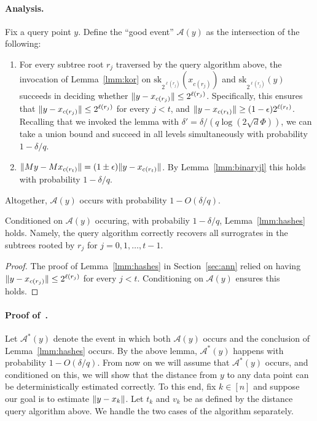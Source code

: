 \paragraph{Analysis.}
Fix a query point $y$.
Define the ``good event'' $\mathcal A(y)$ as the intersection of the following:
\begin{enumerate}
  \item For every subtree root $r_j$ traversed by the query algorithm above, the invocation of Lemma~\ref{lmm:kor} on $\mathrm{sk}_{2^{\ell(r_j)}}(x_{c(r_j)})$ and $\mathrm{sk}_{2^{\ell(r_j)}}(y)$ succeeds in deciding whether $\lVert y-x_{c(r_j)}\rVert\leq 2^{\ell(r_j)}$.
  Specifically, this ensures that $\lVert y-x_{c(r_j)}\rVert\leq 2^{\ell(r_j)}$ for every $j<t$, and $\lVert y-x_{c(r_t)}\rVert\geq (1-\epsilon)2^{\ell(r_t)}$.
  Recalling that we invoked the lemma with $\delta'=\delta/(q\log(2\sqrt{d}\Phi))$, we can take a union bound and succeed in all levels simultaneously with probability $1-\delta/q$.

  \item $\lVert My-Mx_{c(r_t)}\rVert=(1\pm\epsilon)\lVert y-x_{c(r_t)}\rVert$. By Lemma~\ref{lmm:binaryjl} this holds with probability $1-\delta/q$.
\end{enumerate}
Altogether, $\mathcal A(y)$ occurs with probability $1-O(\delta/q)$.

\begin{lemma}
Conditioned on $\mathcal A(y)$ occuring, with probabiliy $1-\delta/q$, Lemma~\ref{lmm:hashes} holds. Namely, the query algorithm correctly recovers all surrogrates in the subtrees rooted by $r_j$ for $j=0,1,\ldots,t-1$.
\end{lemma}
\begin{proof}
The proof of Lemma~\ref{lmm:hashes} in Section~\ref{sec:ann} relied on having $\lVert y-x_{c(r_j)}\rVert\leq2^{\ell(r_j)}$ for every $j<t$. Conditioning on $\mathcal A(y)$ ensures this holds.
\end{proof}

\paragraph{Proof of~.}
Let $\mathcal A^*(y)$ denote the event in which both $\mathcal A(y)$ occurs and the conclusion of Lemma~\ref{lmm:hashes} occurs. By the above lemma, $\mathcal A^*(y)$ happens with probability $1-O(\delta/q)$.
From now on we will assume that $\mathcal A^*(y)$ occurs, and conditioned on this, we will show that the distance from $y$ to any data point can be deterministically estimated correctly.
%
To this end, fix $k\in[n]$ and suppose our goal is to estimate $\lVert y-x_k\rVert$. Let $t_k$ and $v_k$ be as defined by the distance query algorithm above.
We handle the two cases of the algorithm separately.

